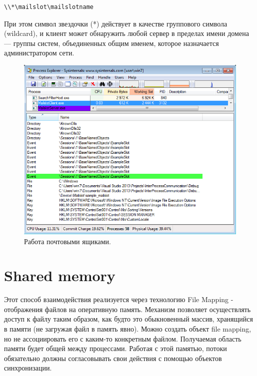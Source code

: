 \documentclass[a4paper, 12pt]{report}		%
\begin{document}
\begin{verbatim}\\*\mailslot\mailslotname
\end{verbatim}

При этом символ звездочки (*) действует в качестве группового символа (wildcard), и клиент может обнаружить любой сервер в пределах имени домена — группы систем, объединенных общим именем, которое назначается администратором сети. 

\begin{figure}[h!]
\centering
\includegraphics[scale=0.75]{res/07_Process_Explorer}
\caption{Работа почтовыми ящиками.}
\end{figure}


\chapter*{Shared memory}

Этот способ взаимодействия реализуется через технологию File Mapping - отображения файлов на оперативную память. Механизм позволяет осуществлять доступ к файлу таким образом, как будто это обыкновенный массив, хранящийся в памяти (не загружая файл в память явно). Можно создать объект file mapping, но не ассоциировать его с каким-то конкретным файлом. Получаемая область памяти будет общей между процессами. Работая с этой памятью, потоки обязательно должны согласовывать свои действия с помощью объектов синхронизации.
\end{document}
